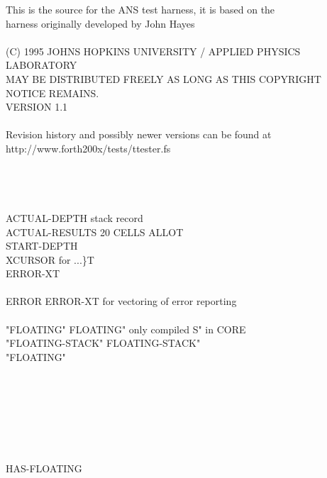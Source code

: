 \frenchspacing
\obeyspaces
\begin{tt}
 This is the source for the ANS test harness, it is based on the\\
 harness originally developed by John Hayes\\
\\
 (C) 1995 JOHNS HOPKINS UNIVERSITY / APPLIED PHYSICS LABORATORY\\
 MAY BE DISTRIBUTED FREELY AS LONG AS THIS COPYRIGHT NOTICE REMAINS.\\
 VERSION 1.1\\
\\
 Revision history and possibly newer versions can be found at\\
 http://www.forth200x/tests/ttester.fs\\
\\
  \\
 \\
\\
 ACTUAL-DEPTH          stack record \\
 ACTUAL-RESULTS 20 CELLS ALLOT \\
 START-DEPTH \\
 XCURSOR               for ...\}T \\
 ERROR-XT \\
\\
\word{:} ERROR ERROR-XT   \word{;}   for vectoring of error reporting \\
\\
\word{:} "FLOATING"  FLOATING" \word{;}    only compiled S" in CORE \\
\word{:} "FLOATING-STACK"  FLOATING-STACK" \word{;} \\
"FLOATING"  \word[tools]{[IF]} \\
\tab \word[tools]{[IF]} \\
\tab[2]  \\
\tab \word[tools]{[ELSE]} \\
\tab[2]  \\
\tab \word[tools]{[THEN]} \\
\word[tools]{[ELSE]} \\
\tab {} \\
\word[tools]{[THEN]}  HAS-FLOATING \\

\end{tt}
